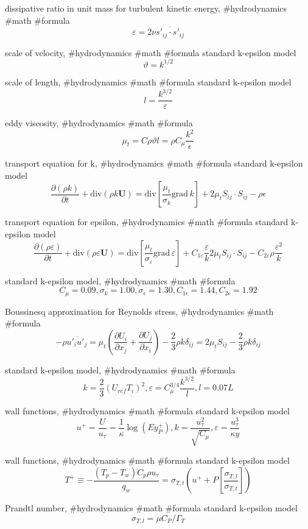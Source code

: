 dissipative ratio in unit mass for turbulent kinetic energy, #hydrodynamics #math #formula
$$
\varepsilon=2\nu\overline{s'_{ij}\cdot s'_{ij}}
$$

scale of velocity, #hydrodynamics #math #formula
standard k-epsilon model
$$
\vartheta=k^{1/2}
$$

scale of length, #hydrodynamics #math #formula
standard k-epsilon model
$$
l=\frac{k^{3/2}}{\varepsilon}
$$

eddy viscosity, #hydrodynamics #math #formula
$$
\mu_t=C\rho\vartheta l=\rho C_\mu\frac{k^2}{\epsilon}
$$

transport equation for k, #hydrodynamics #math #formula
standard k-epsilon model
$$
\frac{\partial(\rho k)}{\partial t}+\mathrm{div}(\rho k \boldsymbol{U})=\mathrm{div}\left[\frac{\mu_t}{\sigma_k}\mathrm{grad}\,k\right]+2\mu_t S_{ij}\cdot S_{ij}-\rho\epsilon
$$

transport equation for epsilon, #hydrodynamics #math #formula
standard k-epsilon model
$$
\frac{\partial(\rho \varepsilon)}{\partial t}+\mathrm{div}(\rho \varepsilon \boldsymbol{U})=\mathrm{div}\left[\frac{\mu_t}{\sigma_\varepsilon}\mathrm{grad}\,\varepsilon\right]+C_{1\varepsilon}\frac{\varepsilon}{k}2\mu_t S_{ij}\cdot S_{ij}-C_{2\varepsilon}\rho\frac{\varepsilon^2}{k}
$$

standard k-epsilon model, #hydrodynamics #math #formula
$$
C_\mu=0.09,\sigma_k=1.00,\sigma_\epsilon=1.30,C_{1\epsilon}=1.44,C_{2\epsilon}=1.92
$$

Boussinesq approximation for Reynolds stress, #hydrodynamics #math #formula
$$
-\rho\overline{u'_i u'_j}=\mu_t\left(\frac{\partial U_i}{\partial x_j}+\frac{\partial U_j}{\partial x_i}\right)-\frac{2}{3}\rho k \delta_{ij}=2\mu_t S_{ij}-\frac{2}{3}\rho k \delta_{ij}
$$

standard k-epsilon model, #hydrodynamics #math #formula
$$
k=\frac{2}{3}(U_{ref}T_i)^2, \varepsilon=C_\mu^{3/4}\frac{k^{3/2}}{l},l=0.07L
$$

wall functions, #hydrodynamics #math #formula
standard k-epsilon model
$$
u^+=\frac{U}{u_\tau}=\frac{1}{\kappa}\log(E y^+_P),k=\frac{u^2_\tau}{\sqrt{C_\mu}},\varepsilon=\frac{u^3_\tau}{\kappa y}
$$

wall functions, #hydrodynamics #math #formula
standard k-epsilon model
$$
T^+\equiv-\frac{(T_p-T_w)C_p\rho u_\tau}{q_w}=\sigma_{T,t}\left(u^+ +P\left[\frac{\sigma_{T,l}}{\sigma_{T,t}}\right]\right)
$$

Prandtl number, #hydrodynamics #math #formula
standard k-epsilon model
$$
\sigma_{T,l}=\mu C_P/\Gamma_T
$$


